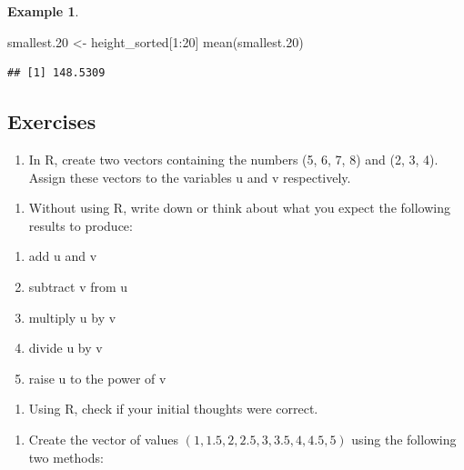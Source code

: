 \documentclass[
]{book}
\newenvironment{Shaded}{\begin{snugshade}}{\end{snugshade}}
\newcommand{\DecValTok}[1]{\textcolor[rgb]{0.00,0.00,0.81}{#1}}
\newcommand{\FloatTok}[1]{\textcolor[rgb]{0.00,0.00,0.81}{#1}}
\newcommand{\FunctionTok}[1]{\textcolor[rgb]{0.00,0.00,0.00}{#1}}
\newcommand{\NormalTok}[1]{#1}
\newcommand{\OtherTok}[1]{\textcolor[rgb]{0.56,0.35,0.01}{#1}}
\newcommand{\SpecialCharTok}[1]{\textcolor[rgb]{0.00,0.00,0.00}{#1}}
\providecommand{\tightlist}{%
  \setlength{\itemsep}{0pt}\setlength{\parskip}{0pt}}
\theoremstyle{definition}
\theoremstyle{definition}
\newtheorem{example}{Example}[chapter]
\theoremstyle{definition}
\theoremstyle{definition}
\theoremstyle{remark}
\begin{document}
\begin{example}
\begin{Shaded}
\begin{Highlighting}[]
\NormalTok{smallest}\FloatTok{.20} \OtherTok{\textless{}{-}}\NormalTok{ height\_sorted[}\DecValTok{1}\SpecialCharTok{:}\DecValTok{20}\NormalTok{]}
\FunctionTok{mean}\NormalTok{(smallest}\FloatTok{.20}\NormalTok{)}
\end{Highlighting}
\end{Shaded}

\begin{verbatim}
## [1] 148.5309
\end{verbatim}

\end{example}

\hypertarget{exercises}{%
\subsection{Exercises}\label{exercises}}

\begin{enumerate}
\def\labelenumi{\arabic{enumi}.}
\tightlist
\item
  In R, create two vectors containing the numbers (5, 6, 7, 8) and (2, 3, 4). Assign these vectors to the variables u and v respectively.
\end{enumerate}

\begin{enumerate}
\def\labelenumi{\roman{enumi}.}
\tightlist
\item
  Without using R, write down or think about what you expect the following results to produce:
\end{enumerate}

\begin{enumerate}
\def\labelenumi{\alph{enumi}.}
\tightlist
\item
  add u and v
\item
  subtract v from u
\item
  multiply u by v
\item
  divide u by v
\item
  raise u to the power of v
\end{enumerate}

\begin{enumerate}
\def\labelenumi{\roman{enumi}.}
\setcounter{enumi}{1}
\tightlist
\item
  Using R, check if your initial thoughts were correct.
\end{enumerate}

\begin{enumerate}
\def\labelenumi{\arabic{enumi}.}
\setcounter{enumi}{1}
\tightlist
\item
  Create the vector of values \((1, 1.5, 2, 2.5, 3, 3.5, 4, 4.5, 5)\) using the following two methods:
\end{enumerate}
\end{document}
